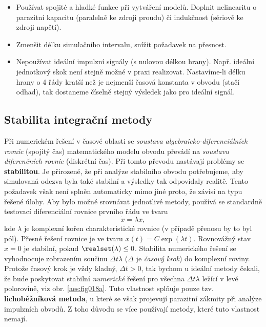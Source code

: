       \begin{mdframed}[style=mdnote]
        \begin{note}
          \begin{itemize}[noitemsep]
            \item Používat spojité a hladké funkce při vytváření modelů. Doplnit nelinearitu o
                  parazitní kapacitu (paralelně ke zdroji proudu) či indukčnost (sériově ke zdroji
                  napětí).
            \item Zmenšit délku simulačního intervalu, snížit požadavek na přesnost. 
            \item Nepoužívat ideální impulzní signály (s nulovou délkou hrany). Např. ideální
                  jednotkový skok není stejně možné v praxi realizovat. Nastavíme-li délku hrany o
                  \num{4} řády kratší než je nejmenší časová konstanta v obvodu (stačí odhad), tak
                  dostaneme číselně stejný výsledek jako pro ideální signál.
          \end{itemize}
        \end{note}
      \end{mdframed}

      \subsection{Stabilita integrační metody}
        Při numerickém řešení v časové oblasti se \emph{soustava algebraicko-diferenciálních rovnic}
        (spojitý čas) matematického modelu obvodu převádí na \emph{soustavu diferenčních rovnic}
        (diskrétní čas). Při tomto převodu nastávají problémy se \textbf{stabilitou}. Je přirozené, že
        při analýze stabilního obvodu potřebujeme, aby simulovaná odezva byla také stabilní a výsledky
        tak odpovídaly realitě. Tento požadavek však není splněn automaticky mimo jiné proto, že
        závisí na typu řešené úlohy. Aby bylo možné srovnávat jednotlivé metody, používá se standardně
        testovací diferenciální rovnice prvního řádu ve tvaru
        \begin{equation}\label{aes:eq025}
          \dot{x} = \lambda x, 
        \end{equation}
        kde \(\lambda\) je komplexní kořen charakteristické rovnice (v případě přenosu by to byl
        pól). Přesné řešení rovnice je ve tvaru \(x(t) = C\exp(\lambda t)\). Rovnovážný stav \(x =
        0\) je stabilní, pokud \(\realset(\lambda)\leq0\). Stabilita numerického řešení se
        vyhodnocuje zobrazením součinu \(\Delta t\lambda\) (\(\Delta\) je \emph{časový krok}) do
        komplexní roviny. Protože časový krok je vždy kladný, \(\Delta t>0\), tak bychom u ideální
        metody čekali, že bude poskytovat stabilní \emph{numerické} řešení pro všechna
        \(\Delta t\lambda\) ležící v levé polorovině, viz obr. \ref{aes:fig018a}. Tuto vlastnost
        splňuje pouze tzv. \textbf{lichoběžníková metoda}, u které se však projevují parazitní
        zákmity při analýze impulzních obvodů. Z toho důvodu se více používají metody, které tuto
        vlastnost nemají.

